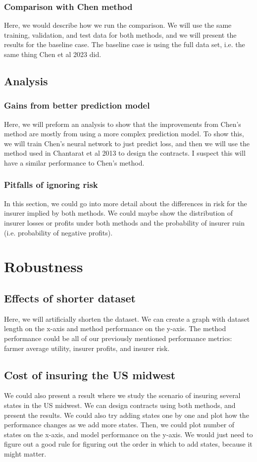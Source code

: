 \documentclass[11pt]{article}
\begin{document}
    \subsubsection{Comparison with Chen method}
      Here, we would describe how we run the comparison. We will use the same training, validation, and test data for both methods, and we will present the results for the baseline case. The baseline case is using the full data set, i.e. the same thing Chen et al 2023 did. 

  \subsection{Analysis}
    \subsubsection{Gains from better prediction model}
      Here, we will preform an analysis to show that the improvements from Chen's method are mostly from using a more complex prediction model. To show this, we will train Chen's neural network to just predict loss, and then we will use the method used in Chantarat et al 2013 to design the contracts. I suspect this will have a similar performance to Chen's method. 

    \subsubsection{Pitfalls of ignoring risk}
      In this section, we could go into more detail about the differences in risk for the insurer implied by both methods. We could maybe show the distribution of insurer losses or profits under both methods and the probability of insurer ruin (i.e. probability of negative profits).

\section{Robustness}
  \subsection{Effects of shorter dataset}
    Here, we will artificially shorten the dataset. We can create a graph with dataset length on the x-axis and method performance on the y-axis. The method performance could be all of our previously mentioned performance metrics: farmer average utility, insurer profits, and insurer risk. 
  \subsection{Cost of insuring the US midwest}
    We could also present a result where we study the scenario of insuring several states in the US midwest. We can design contracts using both methods, and present the results. We could also try adding states one by one and plot how the performance changes as we add more states. Then, we could plot number of states on the x-axis, and model performance on the y-axis. We would just need to figure out a good rule for figuring out the order in which to add states, because it might matter. 
  
\end{document}
